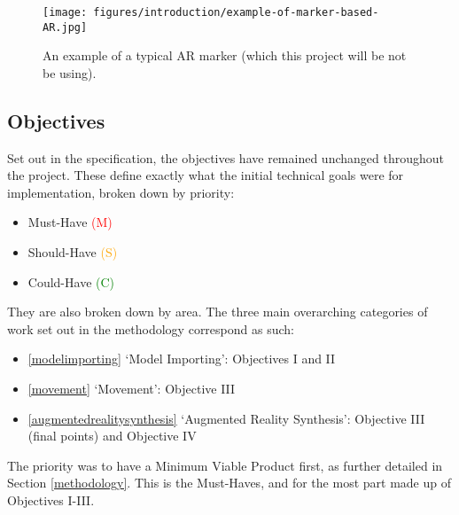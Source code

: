 \documentclass[12pt, a4paper]{article}
\newcommand{\must}[1]{\textcolor{red}{#1}}
\newcommand{\should}[1]{\textcolor{orange}{#1}}
\newcommand{\could}[1]{\textcolor{green}{#1}}
\begin{document}
\begin{figure}[H]
    \centering
    \texttt{[image: figures/introduction/example-of-marker-based-AR.jpg]}
    \caption{An example of a typical AR marker (which this project will be not be using). \cite{originality:armarker}}
    \label{fig:ARmarker}
\end{figure}

\subsection{Objectives}
\label{Objectives}
Set out in the specification, the objectives have remained unchanged throughout the project. These define exactly what the initial technical goals were for implementation, broken down by priority: 
\begin{itemize}
    \item Must-Have \must{(M)}
    \item Should-Have \should{(S)}
    \item Could-Have \could{(C)}
\end{itemize}

They are also broken down by area. The three main overarching categories of work set out in the methodology correspond as such:
\begin{itemize}
    \item \ref{modelimporting} `Model Importing': Objectives I and II 
    \item \ref{movement} `Movement': Objective III 
    \item \ref{augmentedrealitysynthesis} `Augmented Reality Synthesis': Objective III (final points) and Objective IV 
\end{itemize}

The priority was to have a Minimum Viable Product first, as further detailed in Section \ref{methodology}. This is the Must-Haves, and for the most part made up of Objectives I-III.
\end{document}
